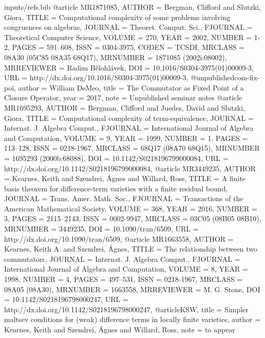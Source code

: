 \begin{filecontents*}{inputs/refs.bib}
@article {MR1871085,
    AUTHOR = {Bergman, Clifford and Slutzki, Giora},
     TITLE = {Computational complexity of some problems involving
              congruences on algebras},
   JOURNAL = {Theoret. Comput. Sci.},
  FJOURNAL = {Theoretical Computer Science},
    VOLUME = {270},
      YEAR = {2002},
    NUMBER = {1-2},
     PAGES = {591--608},
      ISSN = {0304-3975},
     CODEN = {TCSDI},
   MRCLASS = {08A30 (05C85 08A35 68Q17)},
  MRNUMBER = {1871085 (2002i:08002)},
MRREVIEWER = {Radim B{\v{e}}lohl{\'a}vek},
       DOI = {10.1016/S0304-3975(01)00009-3},
       URL = {http://dx.doi.org/10.1016/S0304-3975(01)00009-3},
}
@unpublished{com-fix-poi,
  author    = {William DeMeo},
  title     = {The Commutator as Fixed Point of a Closure Operator},
  year      = {2017},
  note = {Unpublished seminar notes}
}
@article {MR1695293,
    AUTHOR = {Bergman, Clifford and Juedes, David and Slutzki, Giora},
     TITLE = {Computational complexity of term-equivalence},
   JOURNAL = {Internat. J. Algebra Comput.},
  FJOURNAL = {International Journal of Algebra and Computation},
    VOLUME = {9},
      YEAR = {1999},
    NUMBER = {1},
     PAGES = {113--128},
      ISSN = {0218-1967},
   MRCLASS = {68Q17 (08A70 68Q15)},
  MRNUMBER = {1695293 (2000b:68088)},
       DOI = {10.1142/S0218196799000084},
       URL = {http://dx.doi.org/10.1142/S0218196799000084},
}
@article {MR3449235,
    AUTHOR = {Kearnes, Keith and Szendrei, {\'A}gnes and Willard, Ross},
     TITLE = {A finite basis theorem for difference-term varieties with a
              finite residual bound},
   JOURNAL = {Trans. Amer. Math. Soc.},
  FJOURNAL = {Transactions of the American Mathematical Society},
    VOLUME = {368},
      YEAR = {2016},
    NUMBER = {3},
     PAGES = {2115--2143},
      ISSN = {0002-9947},
   MRCLASS = {03C05 (08B05 08B10)},
  MRNUMBER = {3449235},
       DOI = {10.1090/tran/6509},
       URL = {http://dx.doi.org/10.1090/tran/6509},
}
@article {MR1663558,
    AUTHOR = {Kearnes, Keith A. and Szendrei, {\'A}gnes},
     TITLE = {The relationship between two commutators},
   JOURNAL = {Internat. J. Algebra Comput.},
  FJOURNAL = {International Journal of Algebra and Computation},
    VOLUME = {8},
      YEAR = {1998},
    NUMBER = {4},
     PAGES = {497--531},
      ISSN = {0218-1967},
   MRCLASS = {08A05 (08A30)},
  MRNUMBER = {1663558},
MRREVIEWER = {M. G. Stone},
       DOI = {10.1142/S0218196798000247},
       URL = {http://dx.doi.org/10.1142/S0218196798000247},
}
@article{KSW,
title = {Simpler maltsev conditions for (weak) difference terms in locally finite varieties},
author = {Kearnes, Keith and Szendrei, \'{A}gnes and Willard, Ross},
note = {to appear}
}


\end{filecontents*}
